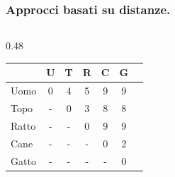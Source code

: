 \begin{frame}
        \frametitle{Approcci basati su distanze.}
        \begin{columns}
                \begin{column}{0.48\textwidth}
                        {
                                \begin{tabular}{l|cccccc}
                                              & U & T & R & C & G \\ \hline
                                        Uomo  & 0 & 4 & 5 & 9 & 9 \\
                                        Topo  & - & 0 & 3 & 8 & 8 \\
                                        Ratto & - & - & 0 & 9 & 9 \\
                                        Cane  & - & - & - & 0 & 2 \\
                                        Gatto & - & - & - & - & 0
                                \end{tabular}
                        }
                \end{column}
        \end{columns}
\end{frame}


